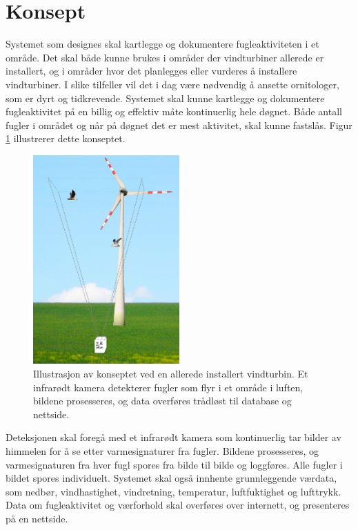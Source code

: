 \section{Konsept}
\label{sec:konsept}

Systemet som designes skal kartlegge og dokumentere fugleaktiviteten i et område. 
Det skal både kunne brukes i områder der vindturbiner allerede er installert, og i områder hvor det planlegges eller vurderes å installere vindturbiner. 
I slike tilfeller vil det i dag være nødvendig å ansette ornitologer, som er dyrt og tidkrevende. 
Systemet skal kunne kartlegge og dokumentere fugleaktivitet på en billig og effektiv måte kontinuerlig hele døgnet. 
Både antall fugler i området og når på døgnet det er mest aktivitet, skal kunne fastslås. Figur \ref{fig:konsept} illustrerer dette konseptet.



\begin{figure}[H]
    \centering
    \includegraphics[width=0.5\textwidth]{konsept/KonseptBilde.png}
    \caption{Illustrasjon av konseptet ved en allerede installert vindturbin. Et infrarødt kamera detekterer fugler som flyr i et område i luften, bildene prosesseres, og data overføres trådløst til database og nettside.}
    \label{fig:konsept}
\end{figure}


Deteksjonen skal foregå med et infrarødt kamera som kontinuerlig tar bilder av himmelen for å se etter varmesignaturer fra fugler. 
Bildene prosesseres, og varmesignaturen fra hver fugl spores fra bilde til bilde og loggføres. 
Alle fugler i bildet spores individuelt. 
Systemet skal også innhente grunnleggende værdata, som nedbør, vindhastighet, vindretning, temperatur, luftfuktighet og lufttrykk. 
Data om fugleaktivitet og værforhold skal overføres over internett, og presenteres på en nettside.






